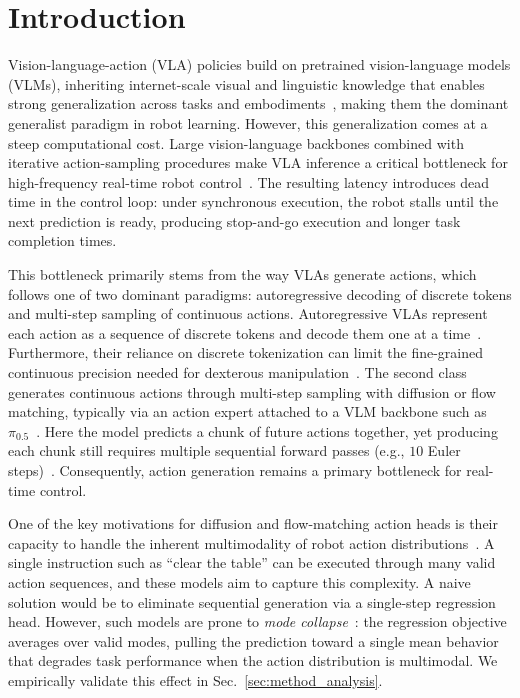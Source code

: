 \documentclass[letterpaper, 10 pt, conference]{ieeeconf}  %
\begin{document}
\section{Introduction}\label{sec:introduction}

Vision-language-action (VLA) policies build on pretrained vision-language models (VLMs), inheriting internet-scale visual and linguistic knowledge that enables strong generalization across tasks and embodiments~\cite{reed2022generalist,openxembodiment2023,brohan2023rt2,kim2024openvla}, making them the dominant generalist paradigm in robot learning. However, this generalization comes at a steep computational cost. Large vision-language backbones combined with iterative action-sampling procedures make VLA inference a critical bottleneck for high-frequency real-time robot control~\cite{vlaperf2025,pertsch2025fast,jeon2025shallow,kim2025openvlaoft,zhang2025quantvla,chen2025rlrc,hirose2025asyncvla,ma2025realtime}. The resulting latency introduces dead time in the control loop: under synchronous execution, the robot stalls until the next prediction is ready, producing stop-and-go execution and longer task completion times.

This bottleneck primarily stems from the way VLAs generate actions, which follows one of two dominant paradigms: autoregressive decoding of discrete tokens and multi-step sampling of continuous actions. Autoregressive VLAs represent each action as a sequence of discrete tokens and decode them one at a time~\cite{openxembodiment2023,brohan2023rt2,kim2024openvla}. Furthermore, their reliance on discrete tokenization can limit the fine-grained continuous precision needed for dexterous manipulation~\cite{black2024pi0,black2025pi05}. The second class generates continuous actions through multi-step sampling with diffusion or flow matching, typically via an action expert attached to a VLM backbone such as $\pi_{0.5}$~\cite{black2025pi05}. Here the model predicts a chunk of future actions together, yet producing each chunk still requires multiple sequential forward passes (e.g., $10$ Euler steps)~\cite{black2024pi0,black2025pi05,ghosh2024octo,liu2024rdt1b,wang2024cogact,wang2024hpt}. Consequently, action generation remains a primary bottleneck for real-time control.

One of the key motivations for diffusion and flow-matching action heads is their capacity to handle the inherent multimodality of robot action distributions~\cite{black2024pi0,black2025pi05}. A single instruction such as ``clear the table'' can be executed through many valid action sequences, and these models aim to capture this complexity. A naive solution would be to eliminate sequential generation via a single-step regression head. However, such models are prone to \textit{mode collapse}~\cite{chi2023diffusionpolicy,shafiullah2022bet,black2024pi0}: the regression objective averages over valid modes, pulling the prediction toward a single mean behavior that degrades task performance when the action distribution is multimodal. We empirically validate this effect in Sec.~\ref{sec:method_analysis}.
\end{document}
